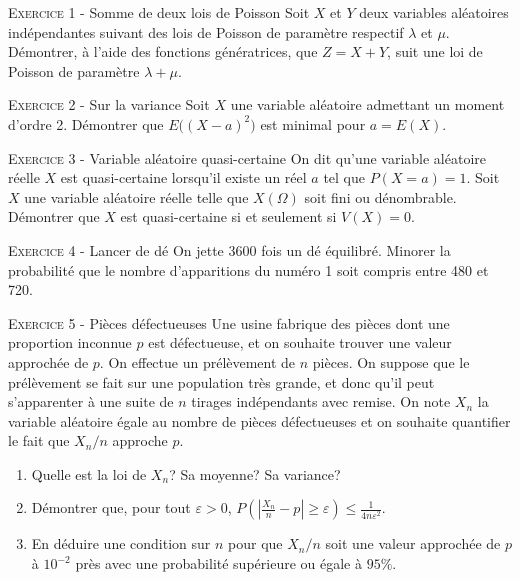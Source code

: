 \documentclass[11pt]{article}
\newcommand{\veps}{\varepsilon}
\begin{document}
 

\begin{center}\textsc{{\huge }}\end{center}



\vskip0.3cm\noindent\textsc{Exercice 1} - Somme de deux lois de Poisson
\vskip0.2cm
Soit $X$ et $Y$ deux variables aléatoires indépendantes suivant des lois de Poisson de paramètre respectif $\lambda$ et $\mu$. Démontrer, à l'aide des fonctions génératrices, que $Z=X+Y$, suit une loi de Poisson de paramètre $\lambda+\mu$.




\vskip0.3cm\noindent\textsc{Exercice 2} - Sur la variance
\vskip0.2cm
Soit $X$ une variable aléatoire admettant un moment d'ordre 2. Démontrer que $E\big((X-a)^2\big)$ est minimal
pour $a=E(X)$.




\vskip0.3cm\noindent\textsc{Exercice 3} - Variable aléatoire quasi-certaine
\vskip0.2cm
On dit qu'une variable aléatoire réelle $X$ est quasi-certaine lorsqu'il existe un réel $a$ tel que $P(X=a)=1$. Soit $X$ une variable aléatoire réelle telle que $X(\Omega)$ soit fini ou dénombrable. Démontrer que $X$ est quasi-certaine si et seulement si $V(X)=0$.




\vskip0.3cm\noindent\textsc{Exercice 4} - Lancer de dé
\vskip0.2cm
On jette 3600 fois un dé équilibré. Minorer la probabilité que le nombre d'apparitions du numéro 1 soit compris entre 480 et 720.




\vskip0.3cm\noindent\textsc{Exercice 5} - Pièces défectueuses
\vskip0.2cm
Une usine fabrique des pièces dont une proportion inconnue $p$ est défectueuse, et on souhaite trouver une valeur approchée de $p$. On effectue un prélèvement de $n$ pièces. On suppose que le prélèvement se fait sur une population très grande, et donc qu'il peut s'apparenter à une suite de $n$  tirages indépendants avec remise. On note $X_n$ la variable aléatoire égale au nombre de pièces défectueuses et on souhaite quantifier le fait que $X_n/n$ approche $p$.
\begin{enumerate}
\item Quelle est la loi de $X_n$? Sa moyenne? Sa variance?
\item Démontrer que, pour tout $\veps>0$, $P\left(\left|\frac{X_n}n-p\right|\geq\veps\right)\leq\frac 1{4n\veps^2}.$
\item En déduire une condition sur $n$ pour que $X_n/n$ soit une valeur approchée de $p$ à $10^{-2}$ près avec une probabilité supérieure ou égale à $95\%$.
\end{enumerate}
\end{document}

